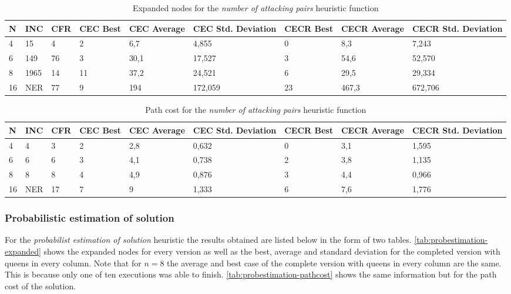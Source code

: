 \documentclass[]{llncs}
\begin{document}
\begin{table}[H]
    \caption{Expanded nodes for the \textit{number of attacking pairs} heuristic function}
    \centering
    \resizebox{1 \textwidth}{!} { %
        \begin{tabular}{|l|l|l|l|l|l|l|l|l|}
            \hline
            N & INC & CFR & CEC Best & CEC Average & CEC Std. Deviation & CECR Best & CECR Average & CECR Std. Deviation \\ \hline
            4 & 15 & 4 & 2 & 6,7 & 4,855 & 0 & 8,3 & 7,243 \\
            6 & 149 & 76 & 3 & 30,1 & 17,527 & 3 & 54,6 & 52,570 \\
            8 & 1965 & 14 & 11 & 37,2 & 24,521 & 6 & 29,5 &	29,334 \\
            16 & NER & 77 & 9 & 194 & 172,059 & 23 & 467,3 & 672,706 \\ \hline
    \end{tabular}
    } %
    \label{tab:nattackingpairs-expanded}
\end{table}

\begin{table}[H]
    \caption{Path cost for the \textit{number of attacking pairs} heuristic function}
    \centering
    \resizebox{1 \textwidth}{!} { %
        \begin{tabular}{|l|l|l|l|l|l|l|l|l|}
            \hline
            N & INC & CFR & CEC Best & CEC Average & CEC Std. Deviation & CECR Best & CECR Average & CECR Std. Deviation \\ \hline
            4 & 4 & 3 & 2 & 2,8 & 0,632 & 0 & 3,1 &	1,595 \\
            6 & 6 & 6 & 3 & 4,1 & 0,738 & 2 & 3,8 & 1,135 \\
            8 & 8 & 8 & 4 & 4,9 & 0,876 & 3	& 4,4 &	0,966 \\
            16 & NER & 17 & 7 & 9 & 1,333 & 6 & 7,6 & 1,776 \\ \hline
    \end{tabular}
    } %
    \label{tab:nattackingpairs-pathcost}
\end{table}
\subsubsection{Probabilistic estimation of solution}
For the \textit{probabilist estimation of solution} heuristic the results obtained are listed below in the form of two tables. \ref{tab:probestimation-expanded} shows the expanded nodes for every version as well as the best, average and standard deviation for the completed version with queens in every column. Note that for $n = 8$ the average and best case of the complete version with queens in every column are the same. This is because only one of ten executions was able to finish.  \ref{tab:probestimation-pathcost} shows the same information but for the path cost of the solution.
\end{document}

